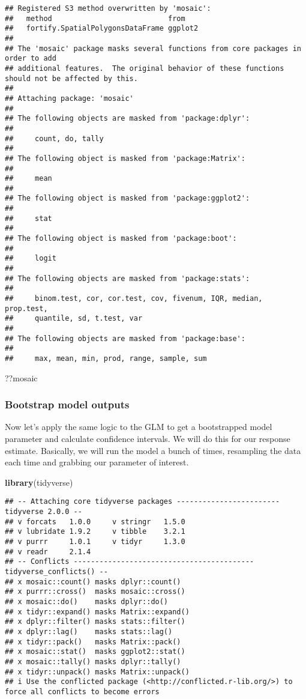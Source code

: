 \documentclass[
]{article}
\newenvironment{Shaded}{\begin{snugshade}}{\end{snugshade}}
\newcommand{\FunctionTok}[1]{\textcolor[rgb]{0.13,0.29,0.53}{\textbf{#1}}}
\newcommand{\NormalTok}[1]{#1}
\begin{document}
\begin{verbatim}
## Registered S3 method overwritten by 'mosaic':
##   method                           from   
##   fortify.SpatialPolygonsDataFrame ggplot2
## 
## The 'mosaic' package masks several functions from core packages in order to add 
## additional features.  The original behavior of these functions should not be affected by this.
## 
## Attaching package: 'mosaic'
## 
## The following objects are masked from 'package:dplyr':
## 
##     count, do, tally
## 
## The following object is masked from 'package:Matrix':
## 
##     mean
## 
## The following object is masked from 'package:ggplot2':
## 
##     stat
## 
## The following object is masked from 'package:boot':
## 
##     logit
## 
## The following objects are masked from 'package:stats':
## 
##     binom.test, cor, cor.test, cov, fivenum, IQR, median, prop.test,
##     quantile, sd, t.test, var
## 
## The following objects are masked from 'package:base':
## 
##     max, mean, min, prod, range, sample, sum
\end{verbatim}

\begin{Shaded}
\begin{Highlighting}[]
\NormalTok{??mosaic}
\end{Highlighting}
\end{Shaded}

\hypertarget{bootstrap-model-outputs}{%
\subsubsection{Bootstrap model outputs}\label{bootstrap-model-outputs}}

Now let's apply the same logic to the GLM to get a bootstrapped model
parameter and calculate confidence intervals. We will do this for our
response estimate. Basically, we will run the model a bunch of times,
resampling the data each time and grabbing our parameter of interest.

\begin{Shaded}
\begin{Highlighting}[]
\FunctionTok{library}\NormalTok{(tidyverse)}
\end{Highlighting}
\end{Shaded}

\begin{verbatim}
## -- Attaching core tidyverse packages ------------------------ tidyverse 2.0.0 --
## v forcats   1.0.0     v stringr   1.5.0
## v lubridate 1.9.2     v tibble    3.2.1
## v purrr     1.0.1     v tidyr     1.3.0
## v readr     2.1.4     
## -- Conflicts ------------------------------------------ tidyverse_conflicts() --
## x mosaic::count() masks dplyr::count()
## x purrr::cross()  masks mosaic::cross()
## x mosaic::do()    masks dplyr::do()
## x tidyr::expand() masks Matrix::expand()
## x dplyr::filter() masks stats::filter()
## x dplyr::lag()    masks stats::lag()
## x tidyr::pack()   masks Matrix::pack()
## x mosaic::stat()  masks ggplot2::stat()
## x mosaic::tally() masks dplyr::tally()
## x tidyr::unpack() masks Matrix::unpack()
## i Use the conflicted package (<http://conflicted.r-lib.org/>) to force all conflicts to become errors
\end{verbatim}
\end{document}
